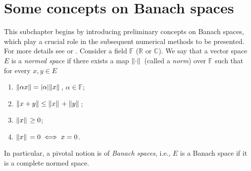 \label{chap:Preliminaries}
\section{Some concepts on Banach spaces}
This subchapter begins by introducing preliminary concepts on Banach spaces, which play a crucial role in the subsequent numerical methods to be presented. For more details see \cite{rudin1991functional} or \cite{brezis2011functional}. Consider a field \(\mathbb{F}\) (\(\mathbb{R}\) or \(\mathbb{C}\)). We say that a vector space \(E\) is a \textit{normed space} if there exists a map \(\norm*{\cdot}\) (called a \textit{norm}) over \(\mathbb{F}\) such that for every \(x, y \in E\)
\begin{enumerate}
    \item \(\norm{\alpha x}= \abs{\alpha}\norm*{x}\), \(\alpha \in \mathbb{F}\);
    \item \(\norm{x + y} \leq \norm*{x} + \norm*{y}\);
    \item \(\norm*{x} \geq 0\);
    \item \(\norm*{x} = 0 \iff x=0\).
\end{enumerate}
In particular, a pivotal notion is of \textit{Banach spaces}, i.e., \(E\) is a Banach space if it is a complete normed space.
